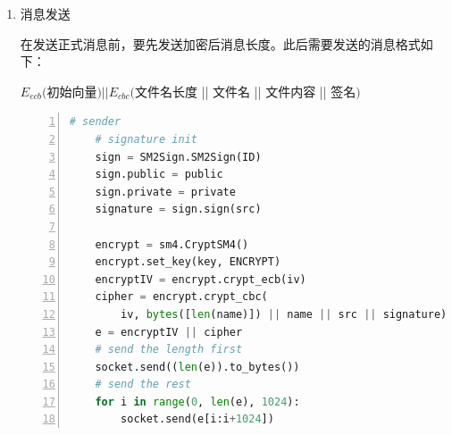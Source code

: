 \documentclass[11pt]{ctexart}
\begin{document}
\begin{enumerate}
    \begin{paracol}{2}
    \begin{lstlisting}[language={python},
    numbers=left,
    numberstyle=\tiny\monaco,
    basicstyle=\small\monaco]
    # sender
    sign = SM2Sign.SM2Sign(ID)
    sign.public = public
    sign.private = private
    k = randint(3, ECCPoint.n - 1)
    pt = point_to_bytes(SM2Sign.SM2Sign.g.multi(k))
    sig = sign.sign(pt)
    socket.send(pt || sig[0] || sig[1])
    other = socket.recv(130)
    otherPt = bytes_to_point(other[:65])
    otherSig = other[65:]
    if not auth.authenticate(other[:65], (otherSig[:32], otherSig[32:])):
        print("Authentication failed while key exchanging.")
        socket.close()
        sys.exit(0)
    key = point_to_bytes(otherPt.multi(k))[1:]
    \end{lstlisting}
    \switchcolumn
    \begin{lstlisting}[language={python},
    numbers=left,
    numberstyle=\tiny\monaco,
    basicstyle=\small\monaco]
    # receiver
    other = socket.recv(130)
    k = randint(3, ECCPoint.n - 1)
    otherPt = bytes_to_point(other[:65])
    otherSig = other[65:]
    if not auth.authenticate(other[:65], (otherSig[:32], otherSig[32:])):
        print("Authentication failed while key exchanging.")
        socket.close()
        sys.exit(0)
    key = point_to_bytes(otherPt.multi(k))[1:]
    sign = SM2Sign.SM2Sign(ID)
    sign.public = public
    sign.private = private
    pt = point_to_bytes(SM2Sign.SM2Sign.g.multi(k))
    sig = sign.sign(pt)
    socket.send(pt || sig[0] || sig[1])
    \end{lstlisting}
    \end{paracol}

    \item 消息发送

    在发送正式消息前，要先发送加密后消息长度。此后需要发送的消息格式如下：

    $E_{ecb}($初始向量$) || E_{cbc}($文件名长度 || 文件名 || 文件内容 || 签名$)$

    \begin{lstlisting}[language={python},
    numbers=left,
    numberstyle=\tiny\monaco,
    basicstyle=\small\monaco]
    # sender
    # signature init
    sign = SM2Sign.SM2Sign(ID)
    sign.public = public
    sign.private = private
    signature = sign.sign(src)

    encrypt = sm4.CryptSM4()
    encrypt.set_key(key, ENCRYPT)
    encryptIV = encrypt.crypt_ecb(iv)
    cipher = encrypt.crypt_cbc(
        iv, bytes([len(name)]) || name || src || signature)
    e = encryptIV || cipher
    # send the length first
    socket.send((len(e)).to_bytes())
    # send the rest
    for i in range(0, len(e), 1024):
        socket.send(e[i:i+1024])
    \end{lstlisting}


\end{enumerate}
\end{document}
